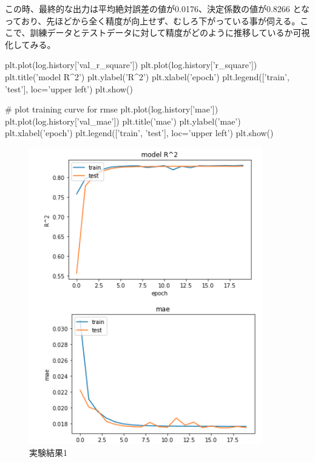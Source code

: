 \documentclass{article}
\begin{document}
この時、最終的な出力は平均絶対誤差の値が0.0176、決定係数の値が0.8266 となっており、先ほどから全く精度が向上せず、むしろ下がっている事が伺える。ここで、訓練データとテストデータに対して精度がどのように推移しているか可視化してみる。
\\

\begin{python}
plt.plot(log.history['val_r_square'])
plt.plot(log.history['r_square'])
plt.title('model R^2')
plt.ylabel('R^2')
plt.xlabel('epoch')
plt.legend(['train', 'test'], loc='upper left')
plt.show()

# plot training curve for rmse
plt.plot(log.history['mae'])
plt.plot(log.history['val_mae'])
plt.title('mae')
plt.ylabel('mae')
plt.xlabel('epoch')
plt.legend(['train', 'test'], loc='upper left')
plt.show()
\end{python}


\begin{figure}[H]
\begin{center}
\includegraphics[width=\linewidth]{experiment1.png}
\caption{実験結果1}
\end{center}
\end{figure}
\end{document}
